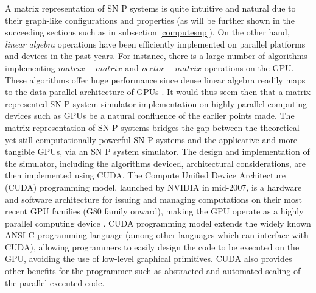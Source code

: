 \documentclass{svmultm}
\newcommand{\sredmark}[2]{\color{red} \sout{#1} #2 \color{black}}
\begin{document}
A matrix representation of SN P systems is quite intuitive and natural due to their graph-like configurations and properties (as will be further shown in the succeeding sections such as in subsection \ref{computesnp}). 
{On the other hand, \textit{linear algebra} operations have been efficiently implemented on parallel platforms and devices in the past years. For instance, there is a large number of algorithms implementing $matrix-matrix$ and $vector-matrix$ operations on the GPU. These algorithms offer huge performance since dense linear algebra readily maps to the data-parallel architecture of GPUs \cite{matrixgpu1,matrixgpu2}}.
It would thus seem then that a matrix represented SN P system simulator implementation on highly parallel computing devices such as  {GPUs} be a natural confluence of the earlier points made. The matrix representation of SN P systems bridges the gap between the theoretical yet still computationally powerful SN P systems and the applicative and more tangible  {GPUs}, via an SN P system simulator. 
{The design and implementation of the simulator, including the algorithms deviced, architectural considerations, are then implemented using CUDA. The Compute Unified Device Architecture (CUDA) programming model, launched by NVIDIA in mid-2007, is a hardware and software architecture for issuing and managing computations on their most recent GPU families (G80 family onward), making the GPU operate as a highly parallel computing device \cite{cudapage}. CUDA programming model extends the widely known ANSI C programming language (among other languages which can interface with CUDA), allowing programmers to easily design the code to be executed on the GPU, avoiding the use of low-level graphical primitives. CUDA also provides other benefits for the programmer such as abstracted and automated scaling of the parallel executed code.}
\end{document}
